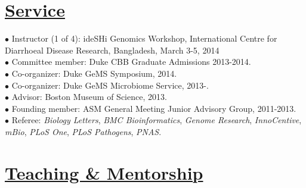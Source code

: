 \documentclass[overlapped,line,11pt]{res}
\begin{document}
\begin{resume}
\section{\underline{\sc Service}}
\vspace{.05in}

\hangindent=0.5in $\bullet$\hspace{.1in} Instructor (1 of 4): ideSHi
Genomics Workshop, International Centre for Diarrhoeal
Disease Research, Bangladesh, March 3-5, 2014 \\

\vspace{-10mm}
\hangindent=0.5in $\bullet$\hspace{.1in} Committee member: Duke CBB Graduate Admissions 2013-2014. \\

\vspace{-10mm}
\hangindent=0.5in $\bullet$\hspace{.1in} Co-organizer: Duke GeMS
Symposium, 2014. \\

\vspace{-10mm}
\hangindent=0.5in $\bullet$\hspace{.1in} Co-organizer: Duke GeMS
Microbiome Service, 2013-. \\

\vspace{-10mm}
\hangindent=0.5in $\bullet$\hspace{.1in} Advisor: Boston Museum of
Science, 2013. \\

\vspace{-10mm}
\hangindent=0.5in $\bullet$\hspace{.1in} Founding member: ASM General Meeting
Junior Advisory Group, 2011-2013. \\

\vspace{-10mm} \hangindent=0.5in $\bullet$\hspace{.1in} Referee:
\emph{Biology Letters}, \emph{BMC Bioinformatics}, \emph{Genome
  Research}, \emph{InnoCentive}, \emph{mBio}, \emph{PLoS One}, \emph{PLoS Pathogens}, \emph{PNAS}.


\section{\underline{\sc Teaching \& Mentorship}}
\vspace{.05in}


\end{resume}
\end{document}

